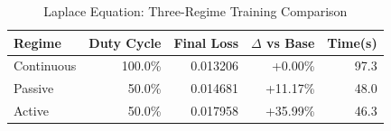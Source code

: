\begin{table}[htbp]
\centering
\caption{Laplace Equation: Three-Regime Training Comparison}
\label{tab:laplace_regimes}
\begin{tabular}{lrrrr}
\hline
Regime & Duty Cycle & Final Loss & $\Delta$ vs Base & Time(s) \\
\hline
Continuous & 100.0\% & 0.013206 & +0.00\% & 97.3 \\
Passive & 50.0\% & 0.014681 & +11.17\% & 48.0 \\
Active & 50.0\% & 0.017958 & +35.99\% & 46.3 \\
\hline
\end{tabular}
\end{table}

